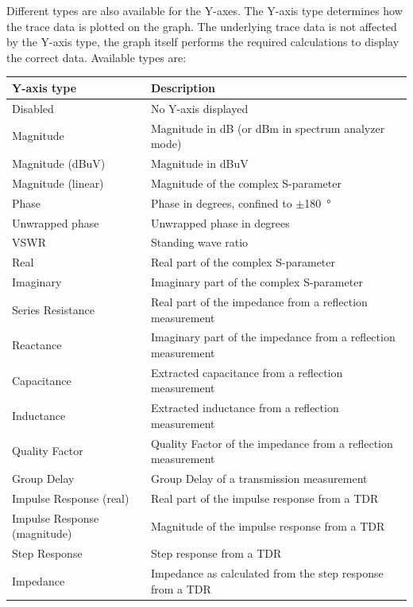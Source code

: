 \documentclass[a4paper,11pt]{article}
\begin{document}
Different types are also available for the Y-axes. The Y-axis type determines how the trace data is plotted on the graph. The underlying trace data is not affected by the Y-axis type, the graph itself performs the required calculations to display the correct data. Available types are:
\begin{center}
\begin{threeparttable}
\begin{tabularx}{\textwidth}{L{5cm}|X}
    \toprule
    \textbf{Y-axis type} & \textbf{Description} \\
    \hline
    Disabled & No Y-axis displayed \\
    \hline
    Magnitude & Magnitude in dB (or dBm in spectrum analyzer mode) \\
    \hline
    Magnitude (dBuV) & Magnitude in dBuV \\
    \hline
    Magnitude (linear) & Magnitude of the complex S-parameter\\
    \hline
    Phase & Phase in degrees, confined to $\pm$\SI{180}{\degree}\\
    \hline
    Unwrapped phase & Unwrapped phase in degrees\\
    \hline
    VSWR & Standing wave ratio\\
    \hline
    Real & Real part of the complex S-parameter\\
    \hline
    Imaginary & Imaginary part of the complex S-parameter\\
    \hline
    Series Resistance & Real part of the impedance from a reflection measurement\\
    \hline
    Reactance & Imaginary part of the impedance from a reflection measurement\\
    \hline
     Capacitance & Extracted capacitance from a reflection measurement\\ 
 \hline
        	 Inductance & Extracted inductance from a reflection measurement\\ 
\hline
        Quality Factor	& Quality Factor of the impedance from a reflection measurement\\ 
\hline
        Group Delay & Group Delay of a transmission measurement\\ 
\hline
        Impulse Response (real)	& Real part of the impulse response from a TDR\\ 
\hline
        Impulse Response (magnitude) & Magnitude of the impulse response from a TDR\\ 
\hline
        Step Response &  Step response from a TDR\\ 
\hline
        Impedance	& Impedance as calculated from the step response from a TDR\\ 
      \bottomrule
\end{tabularx}
\end{threeparttable}
\end{center}
\end{document}
